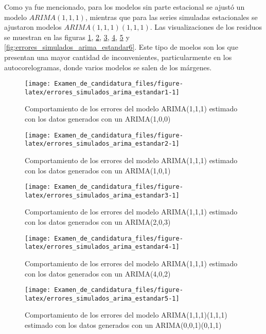 \documentclass[
]{article}
\begin{document}
Como ya fue mencionado, para los modelos sin parte estacional se ajustó
un modelo \(ARIMA(1,1,1)\), mientras que para las series simuladas
estacionales se ajustaron modelos \(ARIMA(1,1,1)(1,1,1)\). Las
visualizaciones de los residuos se muestran en las figuras
\ref{fig:errores_simulados_arima_estandar1},
\ref{fig:errores_simulados_arima_estandar2},
\ref{fig:errores_simulados_arima_estandar3},
\ref{fig:errores_simulados_arima_estandar4},
\ref{fig:errores_simulados_arima_estandar5} y
\ref{fig:errores_simulados_arima_estandar6}. Este tipo de moelos son los
que presentan una mayor cantidad de inconvenientes, particularmente en
los autocorelogramas, donde varios modelos se salen de los márgenes.

\begin{figure}[H]
\texttt{[image: Examen\_de\_candidatura\_files/figure-latex/errores\_simulados\_arima\_estandar1-1]} \caption{Comportamiento de los errores del modelo ARIMA(1,1,1) estimado con los datos generados con un ARIMA(1,0,0)}\label{fig:errores_simulados_arima_estandar1}
\end{figure}

\begin{figure}[H]
\texttt{[image: Examen\_de\_candidatura\_files/figure-latex/errores\_simulados\_arima\_estandar2-1]} \caption{Comportamiento de los errores del modelo ARIMA(1,1,1) estimado con los datos generados con un ARIMA(1,0,1)}\label{fig:errores_simulados_arima_estandar2}
\end{figure}

\begin{figure}[H]
\texttt{[image: Examen\_de\_candidatura\_files/figure-latex/errores\_simulados\_arima\_estandar3-1]} \caption{Comportamiento de los errores del modelo ARIMA(1,1,1) estimado con los datos generados con un ARIMA(2,0,3)}\label{fig:errores_simulados_arima_estandar3}
\end{figure}

\begin{figure}[H]
\texttt{[image: Examen\_de\_candidatura\_files/figure-latex/errores\_simulados\_arima\_estandar4-1]} \caption{Comportamiento de los errores del modelo ARIMA(1,1,1) estimado con los datos generados con un ARIMA(4,0,2)}\label{fig:errores_simulados_arima_estandar4}
\end{figure}

\begin{figure}[H]
\texttt{[image: Examen\_de\_candidatura\_files/figure-latex/errores\_simulados\_arima\_estandar5-1]} \caption{Comportamiento de los errores del modelo ARIMA(1,1,1)(1,1,1) estimado con los datos generados con un ARIMA(0,0,1)(0,1,1)}\label{fig:errores_simulados_arima_estandar5}
\end{figure}
\end{document}
